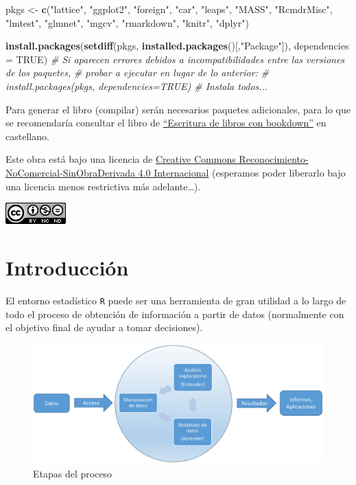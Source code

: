 \documentclass[]{book}
\newenvironment{Shaded}{\begin{snugshade}}{\end{snugshade}}
\newcommand{\KeywordTok}[1]{\textcolor[rgb]{0.13,0.29,0.53}{\textbf{#1}}}
\newcommand{\DataTypeTok}[1]{\textcolor[rgb]{0.13,0.29,0.53}{#1}}
\newcommand{\StringTok}[1]{\textcolor[rgb]{0.31,0.60,0.02}{#1}}
\newcommand{\CommentTok}[1]{\textcolor[rgb]{0.56,0.35,0.01}{\textit{#1}}}
\newcommand{\OtherTok}[1]{\textcolor[rgb]{0.56,0.35,0.01}{#1}}
\newcommand{\NormalTok}[1]{#1}
\begin{document}
\begin{Shaded}
\begin{Highlighting}[]
\NormalTok{pkgs <-}\StringTok{ }\KeywordTok{c}\NormalTok{(}\StringTok{"lattice"}\NormalTok{, }\StringTok{"ggplot2"}\NormalTok{, }\StringTok{"foreign"}\NormalTok{, }\StringTok{"car"}\NormalTok{, }\StringTok{"leaps"}\NormalTok{, }\StringTok{"MASS"}\NormalTok{, }\StringTok{"RcmdrMisc"}\NormalTok{, }
          \StringTok{"lmtest"}\NormalTok{, }\StringTok{"glmnet"}\NormalTok{, }\StringTok{"mgcv"}\NormalTok{, }\StringTok{"rmarkdown"}\NormalTok{, }\StringTok{"knitr"}\NormalTok{, }\StringTok{"dplyr"}\NormalTok{)}

\KeywordTok{install.packages}\NormalTok{(}\KeywordTok{setdiff}\NormalTok{(pkgs, }\KeywordTok{installed.packages}\NormalTok{()[,}\StringTok{"Package"}\NormalTok{]), }\DataTypeTok{dependencies =} \OtherTok{TRUE}\NormalTok{)}
\CommentTok{# Si aparecen errores debidos a incompatibilidades entre las versiones de los paquetes, }
\CommentTok{# probar a ejecutar en lugar de lo anterior:}
\CommentTok{# install.packages(pkgs, dependencies=TRUE) # Instala todos...}
\end{Highlighting}
\end{Shaded}

Para generar el libro (compilar) serán necesarios paquetes adicionales,
para lo que se recomendaría consultar el libro de
\href{https://rubenfcasal.github.io/bookdown_intro}{``Escritura de
libros con bookdown''} en castellano.

Este obra está bajo una licencia de
\href{https://creativecommons.org/licenses/by-nc-nd/4.0/deed.es_ES}{Creative
Commons Reconocimiento-NoComercial-SinObraDerivada 4.0 Internacional}
(esperamos poder liberarlo bajo una licencia menos restrictiva más
adelante\ldots{}).

\includegraphics{by-nc-nd-88x31.png}

\chapter{Introducción}\label{introduccion}

El entorno estadístico \texttt{R} puede ser una herramienta de gran
utilidad a lo largo de todo el proceso de obtención de información a
partir de datos (normalmente con el objetivo final de ayudar a tomar
decisiones).

\begin{figure}[!htb]

{\centering \includegraphics[width=0.7\linewidth]{figuras/esquema2} 

}

\caption{Etapas del proceso}\label{fig:esquema}
\end{figure}
\end{document}
